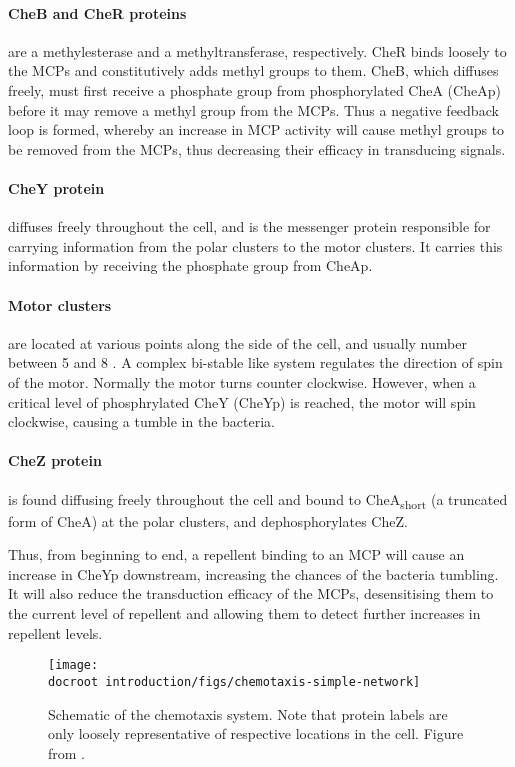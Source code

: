 \documentclass[../main.tex]{subfiles}
\begin{document}
\paragraph{CheB and CheR proteins} are a methylesterase and a methyltransferase, respectively. CheR binds loosely to the MCPs and constitutively adds methyl groups to them. CheB, which diffuses freely, must first receive a phosphate group from phosphorylated CheA (CheAp) before it may remove a methyl group from the MCPs. Thus a negative feedback loop is formed, whereby an increase in MCP activity will cause methyl groups to be removed from the MCPs, thus decreasing their efficacy in transducing signals.

\paragraph{CheY protein} diffuses freely throughout the cell, and is the messenger protein responsible for carrying information from the polar clusters to the motor clusters. It carries this information by receiving the phosphate group from CheAp.

\paragraph{Motor clusters} are located at various points along the side of the cell, and usually number between 5 and 8 \citep{wadhams04}. A complex bi-stable like system regulates the direction of spin of the motor. Normally the motor turns counter clockwise. However, when a critical level of phosphrylated CheY (CheYp) is reached, the motor will spin clockwise, causing a tumble in the bacteria.

\paragraph{CheZ protein} is found diffusing freely throughout the cell and bound to CheA\textsubscript{short} (a truncated form of CheA) at the polar clusters, and dephosphorylates CheZ.

Thus, from beginning to end, a repellent binding to an MCP will cause an increase in CheYp downstream, increasing the chances of the bacteria tumbling. It will also reduce the transduction efficacy of the MCPs, desensitising them to the current level of repellent and allowing them to detect further increases in repellent levels.


\begin{figure}[h!]
\begin{center}
\texttt{[image: \\docroot introduction/figs/chemotaxis-simple-network]}
\caption[Schematic of the chemotaxis system]{Schematic of the chemotaxis system. Note that protein labels are only loosely representative of respective locations in the cell. Figure from \citet{lipkowfigs}.}
\label{fig:chemo:bubble}
\end{center}
\end{figure}
\end{document}

